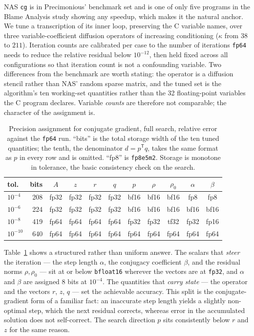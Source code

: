 \documentclass[11pt]{article}
\begin{document}
NAS \texttt{cg} is in Precimonious' benchmark set and is one of only five
programs in the Blame Analysis study showing any speedup, which makes it the
natural anchor. We tune a transcription of its inner loop, preserving the C
variable names, over three variable-coefficient diffusion operators of increasing
conditioning ($\kappa$ from $38$ to $211$). Iteration counts are calibrated per
case to the number of iterations \texttt{fp64} needs to reduce the relative residual
below $10^{-12}$, then held fixed across all configurations so that iteration count
is not a confounding variable. Two differences from the benchmark are worth
stating: the operator is a diffusion stencil rather than NAS' random sparse
matrix, and the tuned set is the algorithm's ten working-set quantities rather
than the 32 floating-point variables the C program declares. Variable
\emph{counts} are therefore not comparable; the character of the assignment is.

\begin{table}[t]
\centering\small
\begin{tabular}{@{}lrccccccccc@{}}
\toprule
tol. & bits & $A$ & $z$ & $r$ & $q$ & $p$ & $\rho$ & $\rho_0$ & $\alpha$ & $\beta$\\
\midrule
$10^{-4}$  & 208 & fp32 & fp32 & fp32 & fp32 & bf16 & bf16 & bf16 & fp8 & fp8\\
$10^{-6}$  & 224 & fp32 & fp32 & fp32 & fp32 & bf16 & bf16 & bf16 & bf16 & bf16\\
$10^{-8}$  & 419 & fp64 & fp64 & fp64 & fp64 & fp32 & fp32 & tf32 & fp32 & fp16\\
$10^{-10}$ & 640 & fp64 & fp64 & fp64 & fp64 & fp64 & fp64 & fp64 & fp64 & fp64\\
\bottomrule
\end{tabular}
\caption{Precision assignment for conjugate gradient, full search, relative
error against the \texttt{fp64} run. ``bits'' is the total storage width of the
ten tuned quantities; the tenth, the denominator $d = p^{\mathsf{T}} q$, takes
the same format as $p$ in every row and is omitted. ``fp8'' is
\texttt{fp8e5m2}. Storage is monotone in tolerance, the basic consistency check
on the search.}
\label{tab:cg}
\end{table}

Table~\ref{tab:cg} shows a structured rather than uniform answer. The scalars
that \emph{steer} the iteration --- the step length $\alpha$, the conjugacy
coefficient $\beta$, and the residual norms $\rho, \rho_0$ --- sit at or below
\texttt{bfloat16} wherever the vectors are at \texttt{fp32}, and $\alpha$ and
$\beta$ are assigned 8 bits at $10^{-4}$. The quantities that \emph{carry state} ---
the operator and the vectors $r$, $z$, $q$ --- set the achievable accuracy. This
split is
the conjugate-gradient form of a familiar fact: an inaccurate step length yields a
slightly non-optimal step, which the next residual corrects, whereas error in the
accumulated solution does not self-correct. The search direction $p$ sits
consistently below $r$ and $z$ for the same reason.
\end{document}
